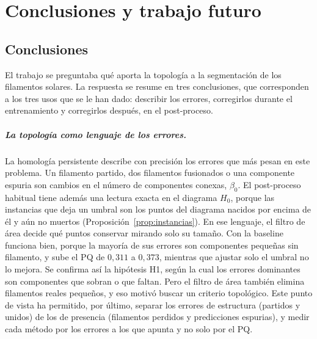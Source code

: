 
\chapter{Conclusiones y trabajo futuro}
\label{cap:conclusiones}

\section{Conclusiones}

El trabajo se preguntaba qué aporta la topología a la segmentación de
los filamentos solares. La respuesta se resume en tres conclusiones, que
corresponden a los tres usos que se le han dado: describir los errores,
corregirlos durante el entrenamiento y corregirlos después, en el
post-proceso.

\paragraph{La topología como lenguaje de los errores.} La homología
persistente describe con precisión los errores que más pesan en este
problema. Un filamento partido, dos filamentos fusionados o una
componente espuria son cambios en el número de componentes conexas,
$\beta_0$. El post-proceso habitual tiene además una lectura exacta en
el diagrama $H_0$, porque las instancias que deja un umbral son los
puntos del diagrama nacidos por encima de él y aún no muertos
(Proposición~\ref{prop:instancias}). En ese lenguaje, el filtro de área
decide qué puntos conservar mirando solo su tamaño. Con la baseline
funciona bien, porque la mayoría de sus errores son componentes pequeñas
sin filamento, y sube el PQ de $0{,}311$ a $0{,}373$, mientras que
ajustar solo el umbral no lo mejora. Se confirma así la hipótesis H1,
según la cual los errores dominantes son componentes que sobran o que
faltan. Pero el filtro de área también elimina filamentos reales
pequeños, y eso motivó buscar un criterio topológico. Este punto de
vista ha permitido, por último, separar los errores de estructura
(partidos y unidos) de los de presencia (filamentos perdidos y
predicciones espurias), y medir cada método por los errores a los que
apunta y no solo por el PQ.

